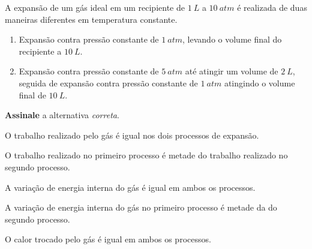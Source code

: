 \documentclass[braun, twocolumn]{braun}
\begin{document}
\begin{problem}
[2A07]A expansão de um gás ideal em um recipiente de \(\qty{1}{L}\) a
\(\qty{10}{atm}\) é realizada de duas maneiras diferentes em temperatura
constante.

\begin{enumerate}
\def\labelenumi{\arabic{enumi}.}

\item
  Expansão contra pressão constante de \(\qty{1}{atm}\), levando o volume
  final do recipiente a \(\qty{10}{L}\).
\item
  Expansão contra pressão constante de \(\qty{5}{atm}\) até atingir um
  volume de \(\qty{2}{L}\), seguida de expansão contra pressão constante
  de \(\qty{1}{atm}\) atingindo o volume final de \(\qty{10}{L}\).
\end{enumerate}

\textbf{Assinale} a alternativa \emph{correta}.


\begin{choices}

\item O trabalho realizado pelo gás é igual nos dois processos de expansão.

\item O trabalho realizado no primeiro processo é metade do trabalho realizado
no segundo processo.

\item A variação de energia interna do gás é igual em ambos os processos.

\item A variação de energia interna do gás no primeiro processo é metade da do
segundo processo.

\item O calor trocado pelo gás é igual em ambos os processos.

\end{choices}

\end{problem}
\end{document}
